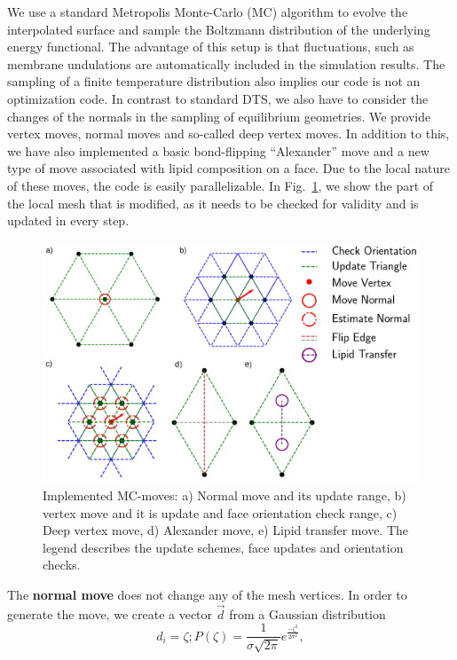 \documentclass[twocolumn]{biophys-new}
\begin{document}
We use a standard Metropolis Monte-Carlo (MC) algorithm to evolve the interpolated surface and sample the Boltzmann distribution of the underlying energy functional. The advantage of this setup is that fluctuations, such as membrane undulations are automatically included in the simulation results. The sampling of a finite temperature distribution also implies our code is not an optimization code.
In contrast to standard DTS, we also have to consider the changes of the normals in the sampling of equilibrium geometries. We provide vertex moves, normal moves and so-called deep vertex moves. In addition to this, we have also implemented a basic bond-flipping ``Alexander'' move and a new type of move associated with lipid composition on a face. Due to the local nature of these moves, the code is easily parallelizable. In Fig.~\ref{fig:moves}, we show the part of the local mesh that is modified, as it needs to be checked for validity and is updated in every step. 
\begin{figure}[hbt]
\centering
\includegraphics[width=\linewidth]{fig/moves.png}

\caption{Implemented MC-moves: a) Normal move and its update range, b) vertex move and it is update and face orientation check range, c) Deep vertex move, d) Alexander move, e) Lipid transfer move.  The legend describes the update schemes, face updates and orientation checks.}
\label{fig:moves}
\end{figure}
The \textbf{normal move} does not change any of the mesh vertices. In order to generate the move,
we create a vector $\vec{d}$ from a Gaussian distribution
\begin{equation}
   d_i = \zeta ; P(\zeta) = \frac{1}{\sigma \sqrt{2 \pi}} e^{\frac{-\zeta^2}{2\sigma^2}}, 
\end{equation}
\end{document}
